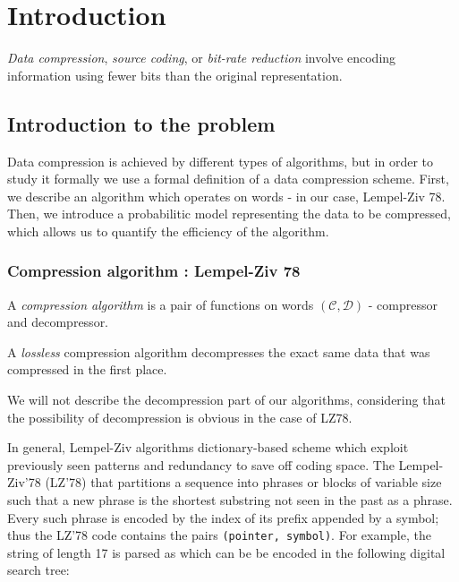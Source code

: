 \section{ Introduction }

\emph{Data compression}, \emph{source coding}, or \emph{bit-rate reduction} involve encoding information using fewer bits than the original representation.

\subsection{ Introduction to the problem }

Data compression is achieved by different types of algorithms, but in order
to study it formally we use a formal definition of a data compression scheme. 
First, we describe an algorithm which operates on words - 
in our case, Lempel-Ziv 78.
Then, we introduce a probabilitic model representing
the data to be compressed, which allows us to quantify
the efficiency of the algorithm.


\subsubsection{ Compression algorithm : Lempel-Ziv 78 }

\begin{definition}
    A \emph{compression algorithm} is a pair of functions on
    words $(\mathcal{C}, \mathcal{D})$ - compressor and 
    decompressor.
\end{definition}

\begin{definition}
    \label{def:lossless}
    A \emph{lossless} compression algorithm decompresses 
    the exact same data that was compressed in the first place.
\end{definition}

\begin{rmk}
    We will not describe the decompression part of 
    our algorithms, considering that the possibility
    of decompression is obvious in the case of LZ78.
\end{rmk}

In general, Lempel-Ziv algorithms dictionary-based scheme
which exploit previously seen patterns and redundancy to 
save off coding space. 
The Lempel-Ziv'78 (LZ'78) that partitions a sequence into 
phrases or blocks of variable size such that a new phrase
is the shortest substring not seen in the past as a phrase. 
Every such phrase is encoded by the index of its prefix 
appended by a symbol; thus the LZ'78 code contains the 
pairs \verb|(pointer, symbol)|.
For example, the string 
 of length 17 is parsed
as 
which can be be 
encoded in the following digital search tree:

